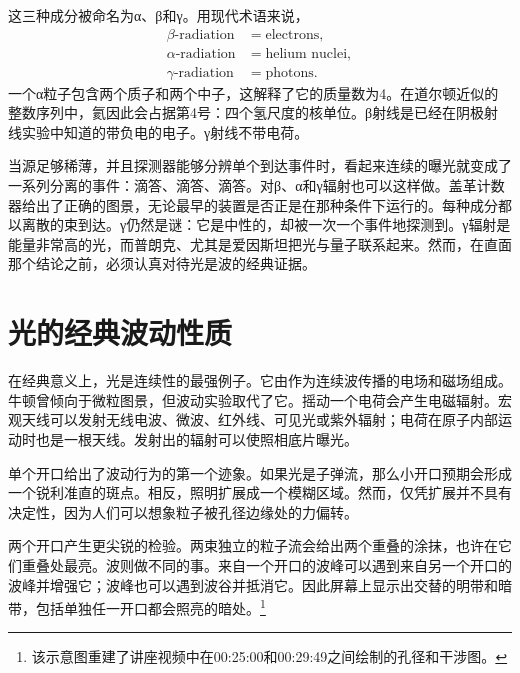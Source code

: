 这三种成分被命名为{\proseunicodefont α}、{\proseunicodefont β}和{\proseunicodefont γ}。用现代术语来说，
\begin{equation}
\begin{aligned}
\beta\text{-radiation} &= \text{electrons},\\
\alpha\text{-radiation} &= \text{helium nuclei},\\
\gamma\text{-radiation} &= \text{photons}.
\end{aligned}
\end{equation}
一个{\proseunicodefont α}粒子包含两个质子和两个中子，这解释了它的质量数为4。在道尔顿近似的整数序列中，氦因此会占据第4号：四个氢尺度的核单位。{\proseunicodefont β}射线是已经在阴极射线实验中知道的带负电的电子。{\proseunicodefont γ}射线不带电荷。

当源足够稀薄，并且探测器能够分辨单个到达事件时，看起来连续的曝光就变成了一系列分离的事件：滴答、滴答、滴答。对{\proseunicodefont β}、{\proseunicodefont α}和{\proseunicodefont γ}辐射也可以这样做。盖革计数器给出了正确的图景，无论最早的装置是否正是在那种条件下运行的。每种成分都以离散的束到达。{\proseunicodefont γ}仍然是谜：它是中性的，却被一次一个事件地探测到。{\proseunicodefont γ}辐射是能量非常高的光，而普朗克、尤其是爱因斯坦把光与量子联系起来。然而，在直面那个结论之前，必须认真对待光是波的经典证据。

\section{光的经典波动性质}

在经典意义上，光是连续性的最强例子。它由作为连续波传播的电场和磁场组成。牛顿曾倾向于微粒图景，但波动实验取代了它。摇动一个电荷会产生电磁辐射。宏观天线可以发射无线电波、微波、红外线、可见光或紫外辐射；电荷在原子内部运动时也是一根天线。发射出的辐射可以使照相底片曝光。

单个开口给出了波动行为的第一个迹象。如果光是子弹流，那么小开口预期会形成一个锐利准直的斑点。相反，照明扩展成一个模糊区域。然而，仅凭扩展并不具有决定性，因为人们可以想象粒子被孔径边缘处的力偏转。

两个开口产生更尖锐的检验。两束独立的粒子流会给出两个重叠的涂抹，也许在它们重叠处最亮。波则做不同的事。来自一个开口的波峰可以遇到来自另一个开口的波峰并增强它；波峰也可以遇到波谷并抵消它。因此屏幕上显示出交替的明带和暗带，包括单独任一开口都会照亮的暗处。\footnote{该示意图重建了讲座视频中在00:25:00和00:29:49之间绘制的孔径和干涉图。}

